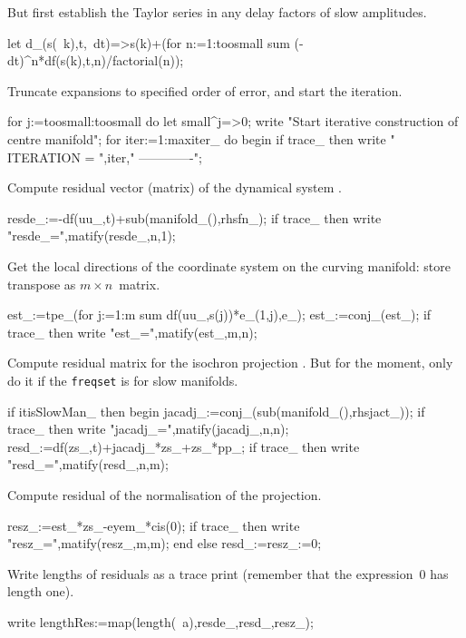 \documentclass[11pt,a5paper]{article}
\begin{document}
But first establish the Taylor series in any delay factors of slow amplitudes.
\begin{reduce}
let d_(s(~k),t,~dt)=>s(k)+(for n:=1:toosmall sum 
        (-dt)^n*df(s(k),t,n)/factorial(n));
\end{reduce}

Truncate expansions to specified order of error, and start the iteration.
\begin{reduce}
for j:=toosmall:toosmall do let small^j=>0;
write "Start iterative construction of centre manifold";
for iter:=1:maxiter_ do begin
if trace_ then write "
ITERATION = ",iter,"
-------------";
\end{reduce}

Compute residual vector (matrix) of the dynamical system \cite{Roberts96a}.
\begin{reduce}
resde_:=-df(uu_,t)+sub(manifold_(),rhsfn_);
if trace_ then write "resde_=",matify(resde_,n,1);
\end{reduce}

Get the local directions of the coordinate system on the curving manifold: store transpose as \(m\times n\)~matrix.
\begin{reduce}
est_:=tpe_(for j:=1:m sum df(uu_,s(j))*e_(1,j),e_);
est_:=conj_(est_);
if trace_ then write "est_=",matify(est_,m,n);
\end{reduce}

Compute residual matrix for the isochron projection \cite{Roberts89b, Roberts97b}. 
But for the moment, only do it if the \verb|freqset| is for slow manifolds.
\begin{reduce}
if itisSlowMan_ then begin
    jacadj_:=conj_(sub(manifold_(),rhsjact_));
if trace_ then write "jacadj_=",matify(jacadj_,n,n);
    resd_:=df(zs_,t)+jacadj_*zs_+zs_*pp_;
if trace_ then write "resd_=",matify(resd_,n,m);
\end{reduce}

Compute residual of the normalisation of the projection.
\begin{reduce}
    resz_:=est_*zs_-eyem_*cis(0);
if trace_ then write "resz_=",matify(resz_,m,m);
end else resd_:=resz_:=0; %
\end{reduce}

Write lengths of residuals as a trace print (remember that the expression~$0$ has length one).
\begin{reduce}
write lengthRes:=map(length(~a),{resde_,resd_,resz_});
\end{reduce}
\end{document}
